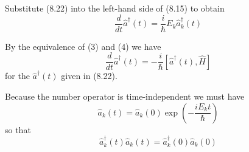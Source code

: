 \documentclass[12pt]{article}
\begin{document}
Substitute (8.22) into the left-hand side of (8.15) to obtain
\begin{equation*}
\frac{d}{dt}\hat a^\dag(t)=\frac{i}{\hbar}E_k\hat a_k^\dag(t)
\tag{4}
\end{equation*}

By the equivalence of (3) and (4) we have
\begin{equation*}
\frac{d}{dt}\hat a^\dag(t)=-\frac{i}{\hbar}\left[\hat a^\dag(t),\hat H\right]
\end{equation*}
for the $\hat a^\dag(t)$ given in (8.22).

\bigskip
Because the number operator is time-independent we must have
\begin{equation*}
\hat a_k(t)=\hat a_k(0)\exp\left(-\frac{iE_kt}{\hbar}\right)
\end{equation*}
so that
\begin{equation*}
\hat a_k^\dag(t)\hat a_k(t)=\hat a_k^\dag(0)\hat a_k(0)
\end{equation*}
\end{document}
